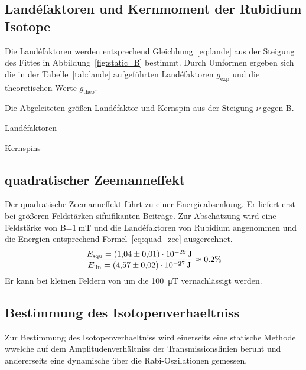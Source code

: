 \subsection{Land\'efaktoren und Kernmoment der Rubidium Isotope}%
\label{sub:landefaktoren_der_rubidium_isotope}
Die Land\'efaktoren werden entsprechend Gleichhung~\ref{eq:lande} aus der Steigung
des Fittes in Abbildung~\ref{fig:static_B} bestimmt. 
Durch Umformen ergeben sich die in der Tabelle~\ref{tab:lande} aufgeführten
Land\'efaktoren $g_\text{exp}$ und die theoretischen Werte $g_\text{theo}$.
\begin{table}[h]
	\centering
	\caption{Die Abgeleiteten größen Land\'efaktor und Kernspin aus der Steigung
	$\nu$ gegen B.}
	\label{tab:lande}
	\begin{subtable}[t]{0.4\textwidth}
	\centering
	\caption{Land\'efaktoren}
	\label{tab:label}
	
	\end{subtable}
	\begin{subtable}[t]{0.4\textwidth}
	\centering
	\caption{Kernspins}
	\label{tab:label}
	
	\end{subtable}
\end{table}

\begin{table}[h]
\end{table}
\subsection{quadratischer Zeemanneffekt}%
\label{sub:quadratischer_zeemanneffekt}
Der quadratische Zeemanneffekt führt zu einer Energieabsenkung. 
Er liefert erst bei größeren Feldstärken sifnifikanten Beiträge.
Zur Abschätzung wird eine Feldstärke von B=$\SI{1}{\milli\tesla}$ 
und die Land\'efaktoren von Rubidium angenommen und die Energien entsprechend
Formel~\ref{eq:quad_zee} ausgerechnet.
\begin{equation}
	\frac{E_\text{squ} = \SI{1.04 +- 0.01e-29}{\joule}}{E_\text{lin} = 
		\SI{4.57 +- 0.02e-27}{\joule}} \approx 0.2 \%
\end{equation}
Er kann bei kleinen Feldern von um die \SI{100}{\micro\tesla} vernachlässigt werden.

\subsection{Bestimmung des Isotopenverhaeltniss}%
\label{sub:bestimmung_des_isotopenverhaeltniss}
Zur Bestimmung des Isotopenverhaeltniss wird einerseits eine statische Methode
wwelche auf dem Amplitudenverhältniss der Transmissionslinien beruht und
andererseits eine dynamische über die Rabi-Oszilationen gemessen.
